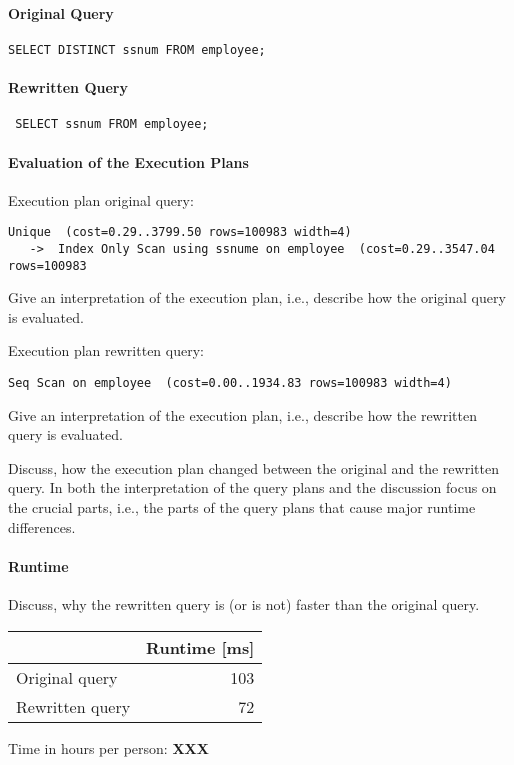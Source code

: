 \documentclass[11pt]{scrartcl}
\begin{document}
\paragraph{Original Query}

{\small
\begin{verbatim}
SELECT DISTINCT ssnum FROM employee;
\end{verbatim}
}

\paragraph{Rewritten Query}

{\small
\begin{verbatim}
 SELECT ssnum FROM employee;
\end{verbatim}
}

\paragraph{Evaluation of the Execution Plans}

Execution plan original query:

\begin{verbatim}
Unique  (cost=0.29..3799.50 rows=100983 width=4)
   ->  Index Only Scan using ssnume on employee  (cost=0.29..3547.04 rows=100983
\end{verbatim}

Give an interpretation of the execution plan, i.e., describe how the
original query is evaluated.

Execution plan rewritten query:

\begin{verbatim}
Seq Scan on employee  (cost=0.00..1934.83 rows=100983 width=4)
\end{verbatim}

Give an interpretation of the execution plan, i.e., describe how the
rewritten query is evaluated.

Discuss, how the execution plan changed between the original and the
rewritten query. In both the interpretation of the query plans and the
discussion focus on the crucial parts, i.e., the parts of the query
plans that cause major runtime differences.

\paragraph{Runtime} Discuss, why the rewritten query is (or is not)
faster than the original query.


\begin{table}[H]
  \begin{tabular}{l|r}
    & Runtime [ms] \\
   \hline
    Original query & 103 \\
    Rewritten query & 72 \\
  \end{tabular}
\end{table}


  Time in hours per person: {\textbf{XXX}}
\end{document}
